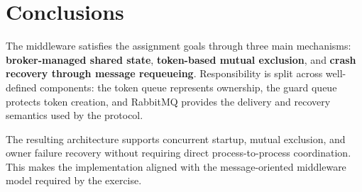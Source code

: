 \clearpage
\section{Conclusions}

The middleware satisfies the assignment goals through three main mechanisms:
\textbf{broker-managed shared state}, \textbf{token-based mutual exclusion},
and \textbf{crash recovery through message requeueing}. Responsibility is split
across well-defined components: the token queue represents ownership, the
guard queue protects token creation, and RabbitMQ provides the delivery and
recovery semantics used by the protocol.

The resulting architecture supports concurrent startup, mutual exclusion, and
owner failure recovery without requiring direct process-to-process
coordination. This makes the implementation aligned with the message-oriented
middleware model required by the exercise.
